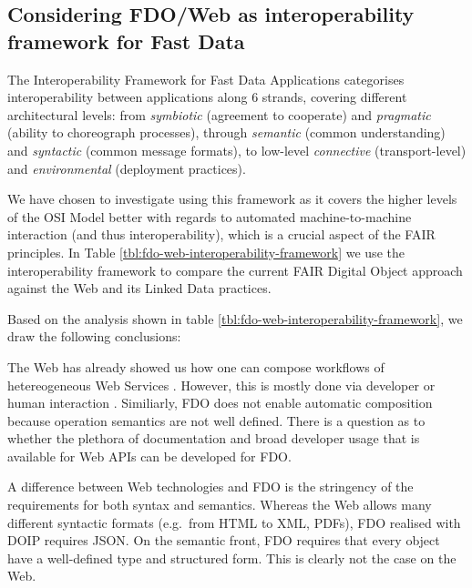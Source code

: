 \documentclass[fleqn,10pt,lineno]{wlpeerjlua}
\begin{document}
\hypertarget{sec:interoperability-compare}{%
\subsection*{Considering FDO/Web as interoperability framework for Fast Data}\label{sec:interoperability-compare}}

The Interoperability Framework for Fast Data Applications \autocite{delgadoInteroperabilityFrameworkDistributed2016a} categorises interoperability between applications along 6 strands, covering different architectural levels: from \emph{symbiotic} (agreement to cooperate) and \emph{pragmatic} (ability to choreograph processes), through \emph{semantic} (common understanding) and \emph{syntactic} (common message formats), to low-level \emph{connective} (transport-level) and \emph{environmental} (deployment practices).

We have chosen to investigate using this framework as it covers the higher levels of the OSI Model \autocite{stallingsHandbookComputercommunicationsStandards1990} better with regards to automated machine-to-machine interaction (and thus interoperability), which is a crucial aspect of the FAIR principles. In Table \ref{tbl:fdo-web-interoperability-framework} we use the interoperability framework to compare the current FAIR Digital Object approach against the Web and its Linked Data practices.



Based on the analysis shown in table \ref{tbl:fdo-web-interoperability-framework}, we draw the following conclusions:

The Web has already showed us how one can compose workflows of hetereogeneous Web Services \autocite{wolstencroftTavernaWorkflowSuite2013d}. However, this is mostly done via developer or human interaction \autocite{lamprechtPerspectivesAutomatedComposition2021b}. Similiarly, FDO does not enable automatic composition because operation semantics are not well defined. There is a question as to whether the plethora of documentation and broad developer usage that is available for Web APIs can be developed for FDO.

A difference between Web technologies and FDO is the stringency of the requirements for both syntax and semantics. Whereas the Web allows many different syntactic formats (e.g.~from HTML to XML, PDFs), FDO realised with DOIP requires JSON. On the semantic front, FDO requires that every object have a well-defined type and structured form. This is clearly not the case on the Web.
\end{document}
